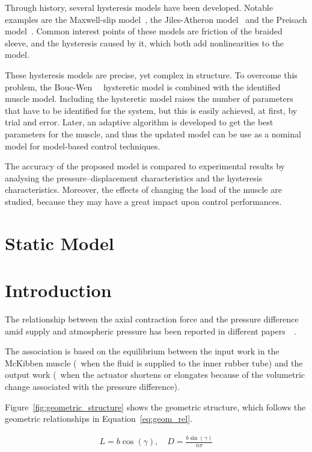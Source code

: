 Through history, several hysteresis models have been developed.
Notable examples are the Maxwell-slip model~\cite{al2005generalized},
the Jiles-Atheron model~\cite{lederer1999parameter}
and the Preisach model~\cite{ge1997generalized}. 
Common interest points of these models are friction of the braided sleeve,
and the hysteresis caused by it, which both add nonlinearities to the model.

These hysteresis models are precise, yet complex in structure.
To overcome this problem, the Bouc-Wen~\cite{bouc}~\cite{bouc_wen} hysteretic model is combined with 
the identified muscle model. Including the hysteretic model raises the number
of parameters that have to be identified for the system, but this is easily
achieved, at first, by trial and error. Later, an adaptive algorithm is developed
to get the best parameters for the muscle, and thus the updated model can be use
as a nominal model for model-based control techniques.

The accuracy of the proposed model is compared to experimental results
by analysing the pressure--displacement characteristics and the hysteresis characteristics.
Moreover, the effects of changing the load of the muscle are studied,
because they may have a great impact upon control performances.

\section{Static Model}


\section{Introduction}
The relationship between the axial contraction force and the pressure difference
amid supply and atmospheric pressure has been reported in different papers~\cite{chou1994static}~\cite{schulte}.

The association is based on the equilibrium between the input work in the McKibben muscle
(\ie~when the fluid is supplied to the inner rubber tube)
and the output work (\ie~when the actuator shortens or elongates
because of the volumetric change associated with the pressure difference).

Figure~\ref{fig:geometric_structure} shows the geometric structure,
which follows the geometric relationships in Equation~\ref{eq:geom_rel}.

\begin{align}
	L = b\cos(\gamma), \quad D = \frac{b \sin(\gamma)}{n \pi}
	\label{fig:geometric_structure}
\end{align}
%	

